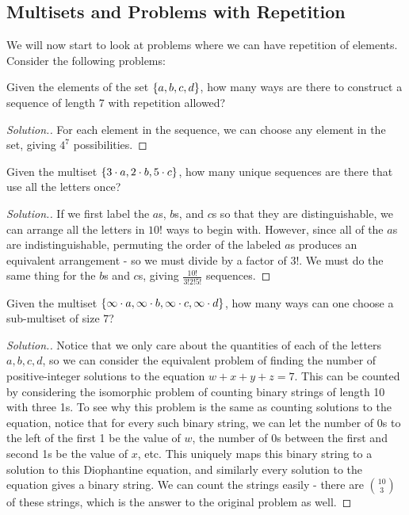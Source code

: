 \subsection{Multisets and Problems with Repetition}
We will now start to look at problems where we can have repetition of elements. Consider the following problems: 
\begin{problem}{2}
Given the elements of the set $\left\{a, b, c, d\right\}$, how many ways are there to construct a sequence of length 7 with repetition allowed?  
\end{problem}
\begin{proof}[Solution.]
For each element in the sequence, we can choose any element in the set, giving $\boxed{4^7}$ possibilities.
\end{proof}
\begin{problem}{3}
Given the multiset $\left\{ 3\cdot a, 2\cdot b, 5 \cdot c \right\}$, how many unique sequences are there that use all the letters once?
\end{problem}
\begin{proof}[Solution.]
If we first label the $a$s, $b$s, and $c$s so that they are distinguishable, we can arrange all the letters in $10!$ ways to begin with. However, since all of the $a$s are indistinguishable, permuting the order of the labeled $a$s produces an equivalent arrangement - so we must divide by a factor of $3!$. We must do the same thing for the $b$s and $c$s, giving $\boxed{\frac{10!}{3! 2! 5!}}$ sequences. 
\end{proof}
\begin{problem}{4}
Given the multiset $\left\{ \infty \cdot a, \infty \cdot b, \infty \cdot c, \infty \cdot d \right\}$, how many ways can one choose a sub-multiset of size $7$? 
\end{problem}
\begin{proof}[Solution.]
Notice that we only care about the quantities of each of the letters $a, b, c, d$, so we can consider the equivalent problem of finding the number of positive-integer solutions to the equation $w + x + y + z = 7$. This can be counted by considering the isomorphic problem of counting binary strings of length 10 with three 1s. To see why this problem is the same as counting solutions to the equation, notice that for every such binary string, we can let the number of $0$s to the left of the first 1 be the value of $w$, the number of $0$s between the first and second 1s be the value of $x$, etc. This uniquely maps this binary string to a solution to this Diophantine equation, and similarly every solution to the equation gives a binary string. We can count the strings easily - there are  $\boxed{\binom{10}{3}}$ of these strings, which is the answer to the original problem as well.
\end{proof}
